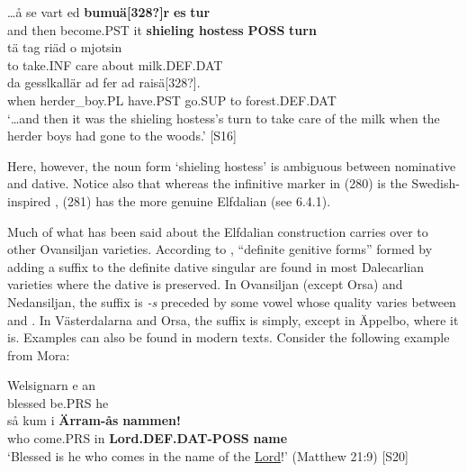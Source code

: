 {{%

\ea\label{}
\gll …å  se  vart  ed  \textbf{bumuä[328?]r} \textbf{es} \textbf{tur}\\
and  then  become.PST  it  \textbf{shieling hostess} \textbf{POSS} \textbf{turn}\\
\gll tä  tag  riäd   o  mjotsin\\
to  take.INF  care  about  milk.DEF.DAT\\
\gll da  gesslkallär  ad  fer  ad  raisä[328?].\\
when  herder\_boy.PL  have.PST  go.SUP  to  forest.DEF.DAT\\
\glt ‘…and then it was the shieling hostess’s turn to take care of the milk when the herder boys had gone to the woods.’ [S16]
\z

Here, however, the noun form  ‘shieling hostess’ is ambiguous between nominative and dative. Notice also that whereas the infinitive marker in (280) is the Swedish-inspired , (281) has the more genuine Elfdalian  (see 6.4.1). 


Much of what has been said about the Elfdalian construction carries over to other Ovansiljan varieties. According to \citet[170]{Levander1928}, “definite genitive forms” formed by adding a suffix to the definite dative singular are found in most Dalecarlian varieties where the dative is preserved. In Ovansiljan (except Orsa) and Nedansiljan, the suffix is\textit{ {}-s} preceded by some vowel whose quality varies between  and . In Västerdalarna and Orsa, the suffix is simply, except in Äppelbo, where it is. Examples can also be found in modern texts. Consider the following example from Mora:


\ea\label{}
\gll Welsignarn  e  an\\
blessed  be.PRS  he\\
\gll så  kum  i  \textbf{Ärram-ås} \textbf{nammen!}\\
who  come.PRS  in  \textbf{Lord.DEF.DAT-POSS} \textbf{name}\\
\glt ‘Blessed is he who comes in the name of the \href{http://www.godrules.net/library/topics/topic1192.htm}{Lord}!’ (Matthew 21:9) [S20]
\z

}}
